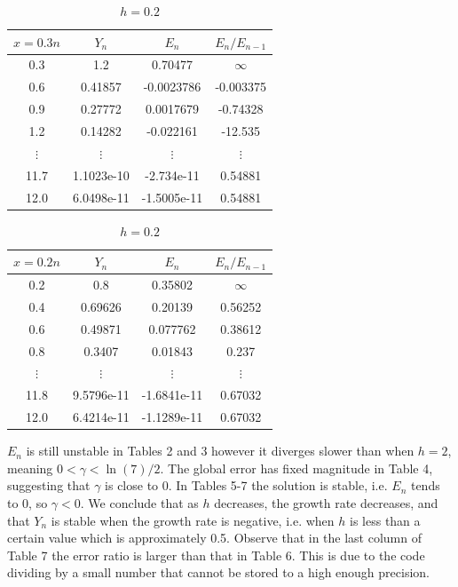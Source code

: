 \documentclass[10pt,a4paper,notitlepage]{article}
\begin{document}
\begin{table}[H]
\parbox{.45\linewidth}{
\centering
\begin{tabular}{|c|c|c|c|}
\hline
$x=0.3n$ & $Y_{n}$ & $E_{n}$ & $E_{n}/E_{n-1}$\\ 
\hline
0.3 & 1.2 & 0.70477 & $\infty$ \\ 0.6 & 0.41857 & -0.0023786 & -0.003375\\ 0.9 & 0.27772 & 0.0017679 & -0.74328\\ 1.2 & 0.14282 & -0.022161 & -12.535\\ $\vdots$ & $\vdots$ & $\vdots$ & $\vdots$\\ 11.7 & 1.1023e-10 & -2.734e-11 & 0.54881\\ 12.0 & 6.0498e-11 & -1.5005e-11 & 0.54881\\ \hline \end{tabular}
\caption{$h=0.3$}
}
\hfill
\parbox{.45\linewidth}{
\centering
\begin{tabular}{|c|c|c|c|}
\hline
$x=0.2n$ & $Y_{n}$ & $E_{n}$ & $E_{n}/E_{n-1}$\\ 
\hline
0.2 & 0.8 & 0.35802 & $\infty$ \\ 0.4 & 0.69626 & 0.20139 & 0.56252\\ 0.6 & 0.49871 & 0.077762 & 0.38612\\ 0.8 & 0.3407 & 0.01843 & 0.237\\ $\vdots$ & $\vdots$ & $\vdots$ & $\vdots$\\ 11.8 & 9.5796e-11 & -1.6841e-11 & 0.67032\\ 12.0 & 6.4214e-11 & -1.1289e-11 & 0.67032\\ \hline \end{tabular}
\caption{$h=0.2$}
}
\end{table}
$E_{n}$ is still unstable in Tables 2 and 3 however it diverges slower than when $h=2$, meaning $0<\gamma<\ln(7)/2$. The global error has fixed magnitude in Table 4, suggesting that $\gamma$ is close to 0. In Tables 5-7 the solution is stable, i.e. $E_{n}$ tends to 0, so $\gamma<0$. We conclude that as $h$ decreases, the growth rate decreases, and that $Y_{n}$ is stable when the growth rate is negative, i.e. when $h$ is less than a certain value which is approximately 0.5.  Observe that in the last column of Table 7 the error ratio is larger than that in Table 6. This is due to the code dividing by a small number that cannot be stored to a high enough precision. 
\end{document}
